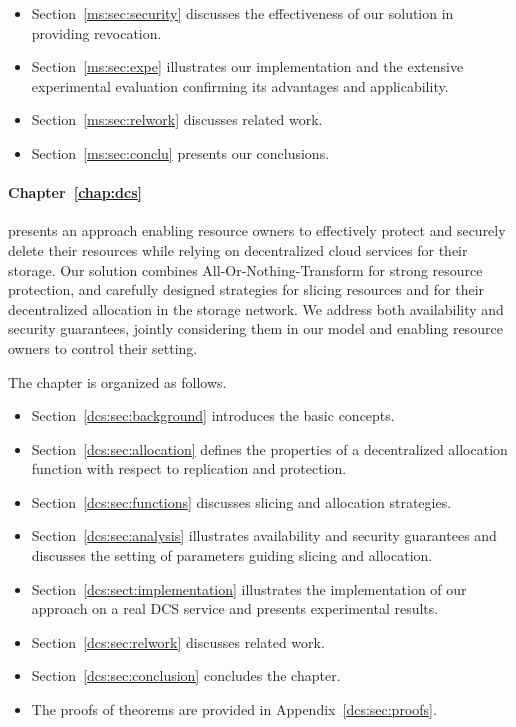 {\begin{itemize}
	\item Section~\ref{ms:sec:security} discusses the effectiveness of our solution in providing revocation.
	
	\item Section~\ref{ms:sec:expe} illustrates our implementation and the extensive experimental evaluation confirming its advantages and applicability. 
	
	\item Section~\ref{ms:sec:relwork} discusses related work. 
	
	\item Section~\ref{ms:sec:conclu} presents our conclusions.
\end{itemize}

\medskip

\paragraph*{Chapter~\ref{chap:dcs}}
presents an approach enabling resource owners to effectively protect and securely delete their resources while relying on decentralized cloud services for their storage.
Our solution combines All-Or-Nothing-Transform for strong resource protection, and carefully designed strategies for slicing resources and for their decentralized allocation in the storage network.  We address both availability and security guarantees, jointly considering them in our model and enabling resource owners to control their setting.

\smallskip

The chapter is organized as follows.

\begin{itemize}
\item Section~\ref{dcs:sec:background} introduces the basic concepts.
\item Section~\ref{dcs:sec:allocation} defines the properties of a decentralized allocation function with respect to replication and protection.
\item Section~\ref{dcs:sec:functions} discusses slicing and allocation strategies.
\item Section~\ref{dcs:sec:analysis} illustrates availability and security guarantees and discusses the setting of parameters guiding slicing and allocation.
\item Section~\ref{dcs:sect:implementation} illustrates the implementation of our approach on a real DCS service and presents experimental results.
\item Section~\ref{dcs:sec:relwork} discusses related work.
\item Section~\ref{dcs:sec:conclusion} concludes the chapter. 
\item The proofs of theorems are provided in Appendix~\ref{dcs:sec:proofs}.
\end{itemize}

}
